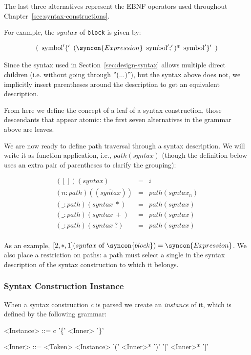 \documentclass{kththesis}
\begin{document}
The last three alternatives represent the EBNF operators used throughout Chapter~\ref{sec:syntax-constructions}.

For example, the $syntax$ of \texttt{block} is given by:

$$
\text{(} \enspace \text{symbol}'\{' \enspace (\syncon{Expression} \enspace \text{symbol}';')\text{*} \enspace \text{symbol}'\}' \enspace \text{)}
$$

Since the syntax used in Section~\ref{sec:design-syntax} allows multiple direct children (i.e. without going through ''($\ldots$)''), but the syntax above does not, we implicitly insert parentheses around the description to get an equivalent description.

From here we define the concept of a leaf of a syntax construction, those descendants that appear atomic: the first seven alternatives in the grammar above are leaves.

We are now ready to define path traversal through a syntax description. We will write it as function application, i.e., $path(syntax)$ (though the definition below uses an extra pair of parentheses to clarify the grouping):

$$
\begin{array}{rcl}
([])(syntax) & = & i \\
(n : path)((\overline{syntax})) & = & path(syntax_n) \\
(\_ : path)(syntax~*) & = & path(syntax) \\
(\_ : path)(syntax~+) & = & path(syntax) \\
(\_ : path)(syntax~?) & = & path(syntax) \\
\end{array}
$$

As an example, $[2, *, 1](syntax \text{ of } \syncon{block}) = \syncon{Expression}$. We also place a restriction on paths: a path must select a single  in the syntax description of the syntax construction to which it belongs.

\subsubsection{Syntax Construction Instance}

When a syntax construction $c$ is parsed we create an \emph{instance} of it, which is defined by the following grammar:

\setlength{\grammarindent}{6.5em}
\begin{grammar}
<Instance> ::= c '\{' <Inner> '\}'

<Inner> ::= <Token>
  \alt <Instance>
  \alt '(' <Inner>* ')'
  \alt '[' <Inner>* ']'
\end{grammar}
\end{document}
